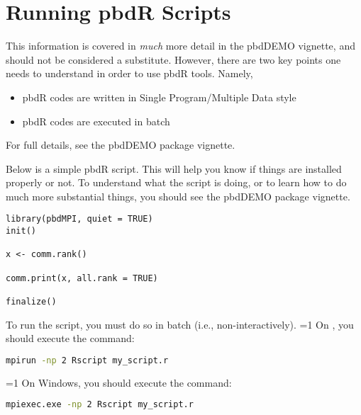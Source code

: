 \section{Running pbdR Scripts}
This information is covered in \emph{much} more detail in the pbdDEMO vignette, and should not be considered a substitute.  However, there are two key points one needs to understand in order to use pbdR tools.  Namely,
\begin{itemize}
  \item pbdR codes are written in Single Program/Multiple Data style
  \item pbdR codes are executed in batch
\end{itemize}
For full details, see the pbdDEMO package vignette.

Below is a simple pbdR script.  This will help you know if things are installed properly or not.  To understand what the script is doing, or to learn how to do much more substantial things, you should see the pbdDEMO package vignette.
\begin{lstlisting}[language=rr]
library(pbdMPI, quiet = TRUE)
init()

x <- comm.rank()

comm.print(x, all.rank = TRUE)

finalize()
\end{lstlisting}

To run the script, you must do so in batch (i.e., non-interactively).
%
\ifnum\value{mac_or_lin}=1
On \maclin, you should execute the command:
\begin{lstlisting}[language=sh]
mpirun -np 2 Rscript my_script.r
\end{lstlisting}
\fi
%
\ifnum\value{include_windows}=1
On Windows, you should execute the command:
\begin{lstlisting}[language=sh]
mpiexec.exe -np 2 Rscript my_script.r
\end{lstlisting}
\fi


